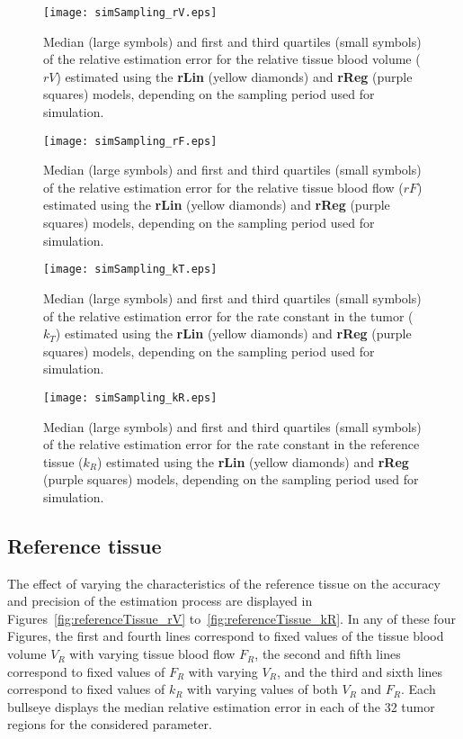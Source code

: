 \begin{subfigures}
    \begin{figure}
        \texttt{[image: simSampling\_rV.eps]}
        \caption{Median (large symbols) and first and third quartiles (small symbols) of the relative estimation error for the relative tissue blood volume ($rV$) estimated using the \textbf{rLin} (yellow diamonds) and \textbf{rReg} (purple squares) models, depending on the sampling period used for simulation.}
        \label{fig:sampling_rV}
    \end{figure}
    \begin{figure}
        \texttt{[image: simSampling\_rF.eps]}
        \caption{Median (large symbols) and first and third quartiles (small symbols) of the relative estimation error for the relative tissue blood flow ($rF$) estimated using the \textbf{rLin} (yellow diamonds) and \textbf{rReg} (purple squares) models, depending on the sampling period used for simulation.}
        \label{fig:sampling_rF}
    \end{figure}
    \begin{figure}
        \texttt{[image: simSampling\_kT.eps]}
        \caption{Median (large symbols) and first and third quartiles (small symbols) of the relative estimation error for the rate constant in the tumor ($k_T$) estimated using the \textbf{rLin} (yellow diamonds) and \textbf{rReg} (purple squares) models, depending on the sampling period used for simulation.}
        \label{fig:sampling_kT}
    \end{figure}
    \begin{figure}
        \texttt{[image: simSampling\_kR.eps]}
        \caption{Median (large symbols) and first and third quartiles (small symbols) of the relative estimation error for the rate constant in the reference tissue ($k_R$) estimated using the \textbf{rLin} (yellow diamonds) and \textbf{rReg} (purple squares) models, depending on the sampling period used for simulation.}
        \label{fig:sampling_kR}
    \end{figure}
\end{subfigures}

\subsection{Reference tissue}
The effect of varying the characteristics of the reference tissue on the accuracy and precision of the estimation process are displayed in Figures~\ref{fig:referenceTissue_rV} to~\ref{fig:referenceTissue_kR}. 
In any of these four Figures, the first and fourth lines correspond to fixed values of the tissue blood volume $V_R$ with varying tissue blood flow $F_R$, the second and fifth lines correspond to fixed values of $F_R$ with varying $V_R$, and the third and sixth lines correspond to fixed values of $k_R$ with varying values of both $V_R$ and $F_R$.
Each bullseye displays the median relative estimation error in each of the 32 tumor regions for the considered parameter.

